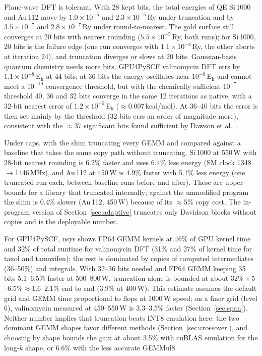 \documentclass[conference]{IEEEtran}
\newcommand{\W}{\,W}
\newcommand{\Eh}{\,E$_\mathrm{h}$}
\newcommand{\Ry}{\,Ry}
\newcommand{\ee}[2]{#1{\times}10^{#2}}  %
\newcommand{\pct}{\%}
\begin{document}
Plane-wave DFT is tolerant. With 28 kept bits, the total energies of QE Si\,1000 and Au\,112 move by
$\ee{1.0}{-5}$ and $\ee{2.3}{-5}$\Ry{} under truncation and by $\ee{3.5}{-7}$ and $\ee{2.8}{-7}$\Ry{} under
round-to-nearest. The gold surface still converges at 20 bits with nearest rounding ($\ee{5.5}{-5}$\Ry, both runs);
for Si\,1000, 20 bits is the failure edge (one run converges with $\ee{1.1}{-4}$\Ry, the other aborts at iteration
24), and truncation diverges or slows at 20 bits. Gaussian-basis quantum chemistry needs more bits. GPU4PySCF
valinomycin DFT errs by $\ee{1.1}{-8}$\Eh{} at 44 bits; at 36 bits the energy oscillates near $10^{-8}$\Eh{} and
cannot meet a $10^{-10}$ convergence threshold, but with the chemically sufficient $10^{-7}$ threshold 40, 36 and 32
bits converge in the same 12 iterations as native, with a 32-bit nearest error of $\ee{1.2}{-5}$\Eh{}
($\approx$0.007\,kcal/mol). At 36--40 bits the error is then set mainly by the threshold (32 bits errs an order of
magnitude more), consistent with the $\approx$37 significant bits found sufficient by Dawson et
al.~\cite{Dawson2024}.

Under caps, with the shim truncating every GEMM and compared against a baseline that takes the same copy path
without truncating, Si\,1000 at 550\W{} with 28-bit nearest rounding is 6.2\pct{} faster and uses 6.4\pct{} less
energy (SM clock 1348$\to$1446\,MHz), and Au\,112 at 450\W{} is 4.9\pct{} faster with 5.1\pct{} less energy (one
truncated run each, between baseline runs before and after).
These are upper bounds for a library that truncated internally; against the unmodified program the shim is
0.4\pct{} slower (Au\,112, 450\W) because of its $\approx$5\pct{} copy cost. The in-program version of
Section~\ref{sec:adaptive} truncates only Davidson blocks without copies and is the deployable number.

For GPU4PySCF, nsys shows FP64 GEMM kernels at 46\pct{} of GPU kernel time and 32\pct{} of total runtime for
valinomycin DFT (31\pct{} and 27\pct{} of kernel time for taxol and tamoxifen); the rest is dominated by copies of
computed intermediates (36--50\pct) and integrals. With 32--36 bits needed and FP64 GEMM keeping 35 bits
5.1--6.5\pct{} faster at 500--800\W, truncation alone is bounded at about $32\pct\times5$--$6.5\pct\approx1.6$--2.1\pct{}
end to end (3.9\pct{} at 400\W). This estimate assumes the default grid and GEMM time proportional to flops at
1000\W{} speed; on a finer grid (level 6), valinomycin measured at 450--550\W{} is 3.3--3.5\pct{} faster
(Section~\ref{sec:span}). Neither number implies that truncation beats INT8 emulation here: the two
dominant GEMM shapes favor different methods (Section~\ref{sec:crossover}), and choosing by shape bounds the gain at
about 3.5\pct{} with cuBLAS emulation for the long-$k$ shape, or 6.6\pct{} with the less accurate GEMMul8.
\end{document}
